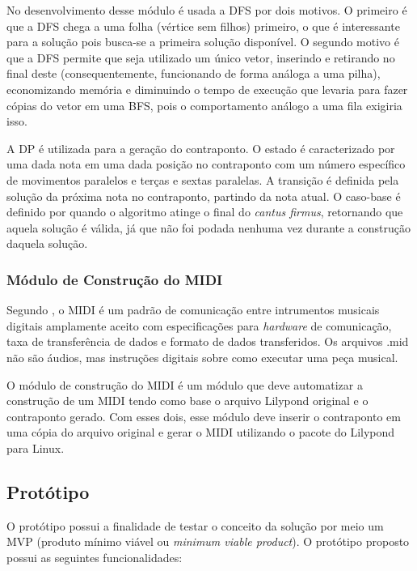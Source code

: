       No desenvolvimento desse módulo é usada a DFS por dois motivos. O primeiro é que a DFS chega a uma folha (vértice sem filhos) primeiro, o que é interessante para a solução pois busca-se a primeira solução disponível. O segundo motivo é que a DFS permite que seja utilizado um único vetor, inserindo e retirando no final deste (consequentemente, funcionando de forma análoga a uma pilha), economizando memória e diminuindo o tempo de execução que levaria para fazer cópias do vetor em uma BFS, pois o comportamento análogo a uma fila exigiria isso.

      A DP é utilizada para a geração do contraponto. O estado é caracterizado por uma dada nota em uma dada posição no contraponto com um número específico de movimentos paralelos e terças e sextas paralelas. A transição é definida pela solução da próxima nota no contraponto, partindo da nota atual. O caso-base é definido por quando o algoritmo atinge o final do \textit{cantus firmus}, retornando que aquela solução é válida, já que não foi podada nenhuma vez durante a construção daquela solução.

    \subsubsection[Módulo de Construção do MIDI]{Módulo de Construção do MIDI}

      Segundo \cite{midi}, o MIDI é um padrão de comunicação entre intrumentos musicais digitais amplamente aceito com especificações para \textit{hardware} de comunicação, taxa de transferência de dados e formato de dados transferidos. Os arquivos .mid não são áudios, mas instruções digitais sobre como executar uma peça musical.

      O módulo de construção do MIDI é um módulo que deve automatizar a construção de um MIDI tendo como base o arquivo Lilypond original e o contraponto gerado. Com esses dois, esse módulo deve inserir o contraponto em uma cópia do arquivo original e gerar o MIDI utilizando o pacote do Lilypond para Linux.

  \subsection[Protótipo]{Protótipo}

    O protótipo possui a finalidade de testar o conceito da solução por meio um MVP (produto mínimo viável ou \textit{minimum viable product}). O protótipo proposto possui as seguintes funcionalidades:

